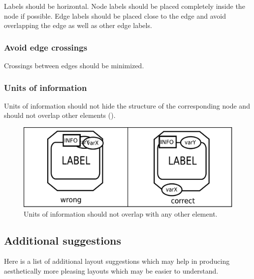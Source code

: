 Labels should be horizontal. Node labels should be placed completely
inside the node if possible. Edge labels should be placed close to
the edge and avoid overlapping the edge as well as other edge
labels.

\subsubsection{Avoid edge crossings}

Crossings between edges should be minimized.

\subsubsection{Units of information}

Units of information should not hide the structure of the
corresponding node and should not overlap other
elements ().

\begin{figure}[h!]
  \centering
  \includegraphics[scale=0.5]{images/layout-unit-information}
  \caption{Units of information should not overlap with any
  other element.}\label{fig:layout7}
\end{figure}

\subsection{Additional suggestions}

Here is a list of additional layout suggestions which may help in
producing aesthetically more pleasing layouts which may be easier to
understand.

